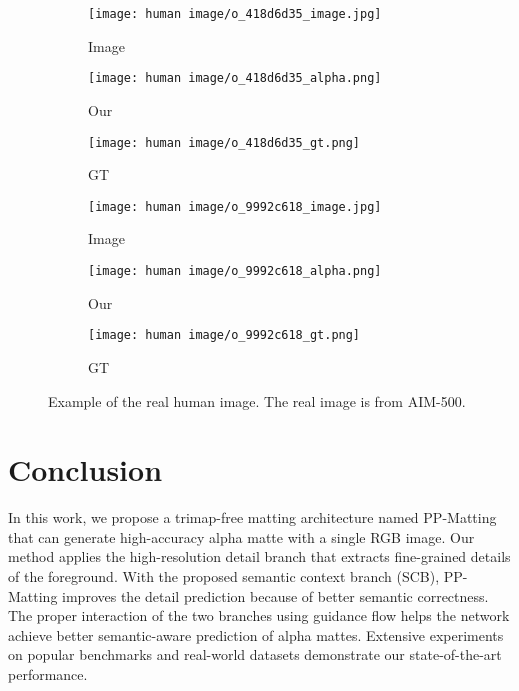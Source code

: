 \documentclass[10pt,twocolumn,letterpaper]{article}
\begin{document}
\begin{figure*}
\centering
  \begin{subfigure}{0.16\linewidth}
    \centerline{\texttt{[image: human image/o\_418d6d35\_image.jpg]}}
    \caption{Image}
    \label{fig:g_image}
  \end{subfigure}
  \centering
  \begin{subfigure}{0.16\linewidth}
    \centerline{\texttt{[image: human image/o\_418d6d35\_alpha.png]}}
    \caption{Our}
    \label{fig:g_alpha}
  \end{subfigure}
  \centering
  \begin{subfigure}{0.16\linewidth}
    \centerline{\texttt{[image: human image/o\_418d6d35\_gt.png]}}
    \caption{GT}
    \label{fig:g_gt}
  \end{subfigure}
\centering
  \begin{subfigure}{0.16\linewidth}
    \centerline{\texttt{[image: human image/o\_9992c618\_image.jpg]}}
    \caption{Image}
    \label{fig:h_image}
  \end{subfigure}
  \centering
  \begin{subfigure}{0.16\linewidth}
    \centerline{\texttt{[image: human image/o\_9992c618\_alpha.png]}}
    \caption{Our}
    \label{fig:h_alpha}
  \end{subfigure}
  \centering
  \begin{subfigure}{0.16\linewidth}
    \centerline{\texttt{[image: human image/o\_9992c618\_gt.png]}}
    \caption{GT}
    \label{fig:h_gt}
  \end{subfigure}
 
  \caption{Example of the real human image. The real image is from AIM-500\cite{li2021deep}.}
  \label{fig:human_example}
\end{figure*}


\section{Conclusion}
In this work, we propose a trimap-free matting architecture named PP-Matting that can generate high-accuracy alpha matte with a single RGB image. Our method applies the high-resolution detail branch that extracts fine-grained details of the foreground. With the proposed semantic context branch (SCB), PP-Matting improves the detail prediction because of better semantic correctness. The proper interaction of the two branches using guidance flow helps the network achieve better semantic-aware prediction of alpha mattes. Extensive experiments on popular benchmarks and real-world datasets demonstrate our state-of-the-art performance. 


{\small


}
\end{document}
